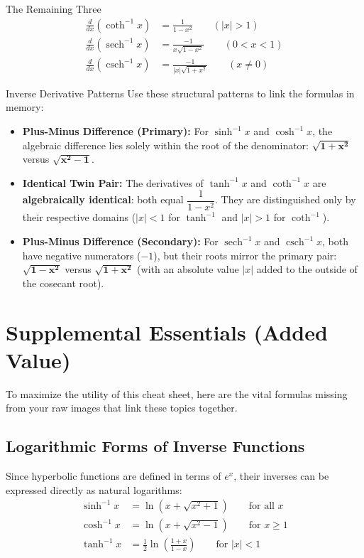 \documentclass[11pt, a4paper]{article}
\DeclareMathOperator{\sech}{sech}
\DeclareMathOperator{\csch}{csch}
\begin{document}
\begin{keyconcept}{The Remaining Three}
\begin{align*}
    \frac{d}{dx}\left(\coth^{-1} x\right) &= \frac{1}{1 - x^2} \qquad (|x| > 1) \\[8pt]
    \frac{d}{dx}\left(\sech^{-1} x\right) &= \frac{-1}{x\sqrt{1 - x^2}} \qquad (0 < x < 1) \\[8pt]
    \frac{d}{dx}\left(\csch^{-1} x\right) &= \frac{-1}{|x|\sqrt{1 + x^2}} \qquad (x \neq 0)
\end{align*}
\end{keyconcept}

\begin{memtip}{Inverse Derivative Patterns}
Use these structural patterns to link the formulas in memory:
\begin{itemize}
    \item \textbf{Plus-Minus Difference (Primary):} For $\sinh^{-1}x$ and $\cosh^{-1}x$, the algebraic difference lies solely within the root of the denominator: $\sqrt{\mathbf{1 + x^2}}$ versus $\sqrt{\mathbf{x^2 - 1}}$.
    \item \textbf{Identical Twin Pair:} The derivatives of $\tanh^{-1}x$ and $\coth^{-1}x$ are \textbf{algebraically identical}: both equal $\dfrac{1}{1-x^2}$. They are distinguished only by their respective domains ($|x| < 1$ for $\tanh^{-1}$ and $|x| > 1$ for $\coth^{-1}$).
    \item \textbf{Plus-Minus Difference (Secondary):} For $\sech^{-1}x$ and $\csch^{-1}x$, both have negative numerators ($-1$), but their roots mirror the primary pair: $\sqrt{\mathbf{1 - x^2}}$ versus $\sqrt{\mathbf{1 + x^2}}$ (with an absolute value $|x|$ added to the outside of the cosecant root).
\end{itemize}
\end{memtip}

\newpage

\section{Supplemental Essentials (Added Value)}
\label{sec:supplemental}
To maximize the utility of this cheat sheet, here are the vital formulas missing from your raw images that link these topics together.

\subsection{Logarithmic Forms of Inverse Functions}
Since hyperbolic functions are defined in terms of $e^x$, their inverses can be expressed directly as natural logarithms:
\begin{align*}
    \sinh^{-1} x &= \ln\left(x + \sqrt{x^2 + 1}\right) \qquad \text{for all } x \\
    \cosh^{-1} x &= \ln\left(x + \sqrt{x^2 - 1}\right) \qquad \text{for } x \geq 1 \\
    \tanh^{-1} x &= \frac{1}{2}\ln\left(\frac{1+x}{1-x}\right) \qquad \text{for } |x| < 1
\end{align*}
\end{document}
